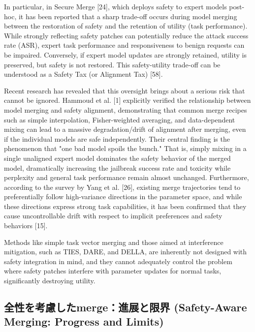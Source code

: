 \documentclass{article}
\begin{document}
In particular, in Secure Merge [24], which deploys safety to expert models post-hoc, it has been reported that a sharp trade-off occurs during model merging between the restoration of safety and the retention of utility (task performance). While strongly reflecting safety patches can potentially reduce the attack success rate (ASR), expert task performance and responsiveness to benign requests can be impaired. Conversely, if expert model updates are strongly retained, utility is preserved, but safety is not restored. This safety-utility trade-off can be understood as a Safety Tax (or Alignment Tax) [58].

Recent research has revealed that this oversight brings about a serious risk that cannot be ignored. Hammoud et al. [1] explicitly verified the relationship between model merging and safety alignment, demonstrating that common merge recipes such as simple interpolation, Fisher-weighted averaging, and data-dependent mixing can lead to a massive degradation/drift of alignment after merging, even if the individual models are safe independently. Their central finding is the phenomenon that "one bad model spoils the bunch." That is, simply mixing in a single unaligned expert model dominates the safety behavior of the merged model, dramatically increasing the jailbreak success rate and toxicity while perplexity and general task performance remain almost unchanged. Furthermore, according to the survey by Yang et al. [26], existing merge trajectories tend to preferentially follow high-variance directions in the parameter space, and while these directions express strong task capabilities, it has been confirmed that they cause uncontrollable drift with respect to implicit preferences and safety behaviors [15].

Methods like simple task vector merging and those aimed at interference mitigation, such as TIES, DARE, and DELLA, are inherently not designed with safety integration in mind, and they cannot adequately control the problem where safety patches interfere with parameter updates for normal tasks, significantly destroying utility.


\subsection{全性を考慮したmerge：進展と限界 (Safety-Aware Merging: Progress and Limits)}
\end{document}
